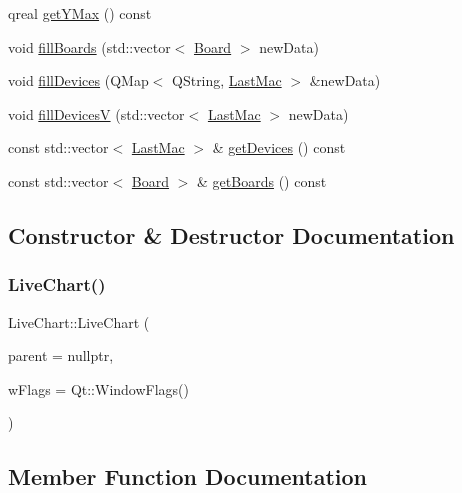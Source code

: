 \begin{DoxyCompactItemize}
\item 
qreal \hyperlink{class_live_chart_a07e50443776326949c789a76b66f6710}{get\+Y\+Max} () const
\item 
void \hyperlink{class_live_chart_a9f5da08d9d15d3c17ff2e818ea8ecccd}{fill\+Boards} (std\+::vector$<$ \hyperlink{class_board}{Board} $>$ new\+Data)
\item 
void \hyperlink{class_live_chart_acb2cf3c9acdbbc1614f20a1e07eeb4a7}{fill\+Devices} (Q\+Map$<$ Q\+String, \hyperlink{class_last_mac}{Last\+Mac} $>$ \&new\+Data)
\item 
void \hyperlink{class_live_chart_accae06e7d26ab24bd161df2eae4e72e8}{fill\+DevicesV} (std\+::vector$<$ \hyperlink{class_last_mac}{Last\+Mac} $>$ new\+Data)
\item 
const std\+::vector$<$ \hyperlink{class_last_mac}{Last\+Mac} $>$ \& \hyperlink{class_live_chart_a98e3b63456491d6ab60b7b406ef2db70}{get\+Devices} () const
\item 
const std\+::vector$<$ \hyperlink{class_board}{Board} $>$ \& \hyperlink{class_live_chart_abe38f270dd1ea9ac2ea0c13ede4650e0}{get\+Boards} () const
\end{DoxyCompactItemize}


\subsection{Constructor \& Destructor Documentation}
\mbox{\label{class_live_chart_ac03ec2247d586d044a7b5483f58df92d}} 
\subsubsection{\texorpdfstring{Live\+Chart()}{LiveChart()}}
{\footnotesize\ttfamily Live\+Chart\+::\+Live\+Chart (\begin{DoxyParamCaption}\item[{Q\+Graphics\+Item $\ast$}]{parent = {\ttfamily nullptr},  }\item[{Qt\+::\+Window\+Flags}]{w\+Flags = {\ttfamily Qt\+:\+:WindowFlags()} }\end{DoxyParamCaption})\hspace{0.3cm}{\ttfamily [explicit]}}



\subsection{Member Function Documentation}
\mbox{\label{class_live_chart_ac721a5c2154777d516f8f280ebee3182}} 
